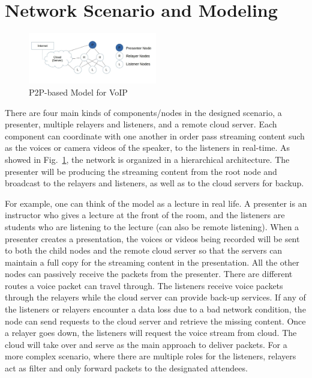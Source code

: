 \section{Network Scenario and Modeling}

\begin{figure}[h!]  
  \centering  
    \includegraphics[width=0.5\textwidth]{figures/model1_test2.jpg}
  \caption{P2P-based Model for VoIP}
  \label{fig:mod1}  
\end{figure}
There are four main kinds of components/nodes in the designed scenario, a 
presenter, multiple relayers and listeners, and a remote cloud server. Each 
component can coordinate with one another in order pass streaming content such 
as the voices or camera videos of the speaker, to the listeners in real-time. As 
showed in Fig.~\ref{fig:mod1}, the network is organized in a hierarchical 
architecture. The presenter will be producing the streaming content from the 
root node and broadcast to the relayers and listeners, as well as to 
the cloud servers for backup. 

For example, one can think of the model as a lecture in real life. A presenter 
is an instructor who gives a lecture at the front of the room, and the 
listeners are 
students who are listening to the lecture (can also be remote listening). When 
a 
presenter creates a presentation, the voices or videos being recorded will be 
sent to both the child nodes and the remote cloud server so that the servers can 
maintain a full copy for the streaming content in the presentation. All the 
other nodes can passively receive the packets from the presenter.
There are different routes a voice packet can travel through. The 
listeners receive voice packets through the relayers while the cloud server 
can provide back-up services. If any of the listeners or relayers encounter a 
data loss due to a bad network condition, the node can send requests to the 
cloud server and retrieve the missing content. Once a relayer goes down, 
the listeners will request the voice stream from cloud. The cloud will take 
over 
and serve as the main approach to deliver packets. 
For a more complex scenario, where there are multiple roles for the listeners, 
relayers act as filter and only forward packets to the designated attendees. 

